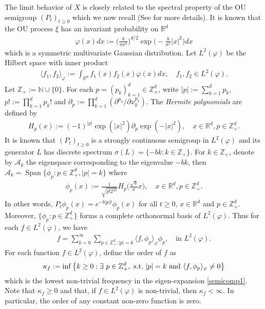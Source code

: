 \documentclass[12pt,a4paper]{amsart}
\theoremstyle{plain}
\theoremstyle{definition}
\numberwithin{equation}{section}
\begin{document}
The limit behavior of $X$  is closely related to the spectral property of the OU semigroup $(P_t)_{t\geq 0}$ which we now recall (See \cite{MetafunePallaraPriola2002Spectrum} for more details).
It is known that the OU process $\xi$ has an invariant probability on $\mathbb R^d$
\begin{align}
  \label{invariantdensity}
  \varphi(x)dx
  :=\Big (\frac{b}{\pi \sigma^2}\Big )^{d/2}\exp \Big(-\frac{b}{\sigma^2}|x|^2 \Big)dx
\end{align}
which is a   symmetric multivariate Gaussian distribution.
Let $L^2(\varphi)$ be the Hilbert space with inner product
\begin{align}
  \langle f_1, f_2 \rangle_{\varphi}
  := \int_{\mathbb R^d}f_1(x)f_2(x)\varphi(x) dx, \quad f_1,f_2 \in L^2(\varphi).
\end{align}
Let $\mathbb Z_+ := \mathbb N\cup\{0\}$.
For each $p = (p_k)_{k = 1}^d \in \mathbb{Z}_+^{d}$, write $|p|:=\sum_{k=1}^d p_k$, $p!:= \prod_{k= 1}^d p_k!$ and $\partial_p:= \prod_{k = 1}^d(\partial^{p_k}/\partial x_k^{p_k})$.
The \emph{Hermite polynomials} are defined by
\begin{align}
  H_p(x)
  :=(-1)^{|p|}\exp(|x|^2) \partial_p \exp(-|x|^2)
  , \quad x\in \mathbb R^d, p \in \mathbb{Z}_+^{d}.
\end{align}
It is known that $(P_t)_{t\geq 0}$ is a strongly continuous semigroup in $L^2(\varphi)$ and its generator $L$ has discrete spectrum $\sigma(L)= \{-bk: k \in \mathbb Z_+\}$.
For $k \in \mathbb Z_+$, denote by $\mathcal{A}_k$ the eigenspace corresponding to the eigenvalue $-bk$, then $ \mathcal{A}_k = \operatorname{Span} \{\phi_p : p\in \mathbb Z_+^d, |p|=k\}$ where
\begin{align}
  \label{eigenfunction}
  \phi_p(x)
  := \frac{1}{\sqrt{ p! 2^{|p|} }} H_p \Big(\frac{ \sqrt{b} }{\sigma}x \Big)
  , \quad x\in \mathbb R^d, p\in \mathbb Z_+^d.
\end{align}
In other words,
\(
  P_t\phi_p(x)
  = e^{-b|p|t}\phi_p(x)
\)
for all $t\geq 0$, $x\in \mathbb R^d$ and $p\in \mathbb Z_+^d$.
Moreover, $\{\phi_p: p \in \mathbb Z_+^d\}$ forms a complete orthonormal basis of $L^2(\varphi)$.
Thus for each $f\in L^2(\varphi)$, we have
\begin{align}
  \label{semicomp1}
  f
  = \sum_{k=0}^{\infty}\sum_{p\in \mathbb Z_+^d:|p|=k}\langle f, \phi_p \rangle_{\varphi} \phi_p
  , \quad \text{in~} L^2(\varphi).
\end{align}
For each function $f\in L^2(\varphi)$, define the order of $f$ as
\[
  \kappa_f
  := \inf \left \{k\geq 0: \exists ~ p\in \mathbb Z_+^d , {\rm ~s.t.~} |p|=k {\rm ~and~}  \langle f, \phi_p \rangle_{\varphi}\neq 0\right \}
\]
which is the lowest non-trivial frequency in the eigen-expansion \eqref{semicomp1}.
Note that $ \kappa_f\geq 0$ and that, if $f\in L^2(\varphi)$ is non-trivial, then $\kappa_f<\infty$.
In particular, the order of any constant non-zero function is zero.
\end{document}
